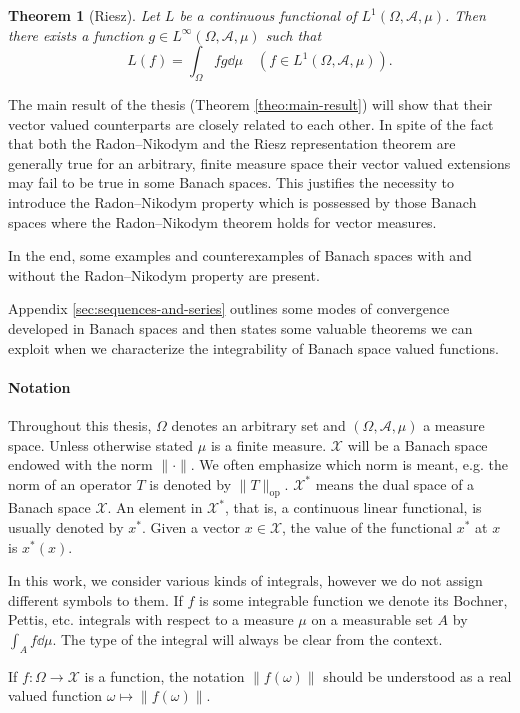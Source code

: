 \documentclass[a4paper, 12pt]{article}
\newtheorem{theo}[lem]{Theorem}
\begin{document}
\begin{theo}[Riesz] Let $L$ be a continuous functional of $L^1(\Omega, \mathcal{A}, \mu)$. Then there exists a function $g \in L^\infty(\Omega, \mathcal{A}, \mu)$ such that
$$
L(f) = \int_{\Omega} f g \dd{\mu} \quad (f \in L^1(\Omega, \mathcal{A}, \mu)).
$$
\end{theo}
The main result of the thesis (Theorem \ref{theo:main-result}) will show that their vector valued counterparts are closely related to each other. In spite of the fact that both the Radon\---Nikodym and the Riesz representation theorem are generally true for an arbitrary, finite measure space their vector valued extensions may fail to be true in some Banach spaces. This justifies the necessity to introduce the Radon\---Nikodym property which is possessed by those Banach spaces where the Radon\---Nikodym theorem holds for vector measures. 

In the end, some examples and counterexamples of Banach spaces with and without the Radon\---Nikodym property are present. 

Appendix \ref{sec:sequences-and-series} outlines some modes of convergence developed in Banach spaces and then states some valuable theorems we can exploit when we characterize the integrability of Banach space valued functions. 

\paragraph*{Notation}
Throughout this thesis, $\Omega$ denotes an arbitrary set and $(\Omega, \mathcal{A}, \mu)$ a measure space. Unless otherwise stated $\mu$ is a finite measure. $\mathcal{X}$ will be a Banach space endowed with the norm $\| \cdot \|$. We often emphasize which norm is meant, e.g. the norm of an operator $T$ is denoted by $\| T \|_{\mathrm{op}}$. $\mathcal{X}^{*}$ means the dual space of a Banach space $\mathcal{X}$. An element in $\mathcal{X}^*$, that is, a continuous linear functional, is usually denoted by $x^*$. Given a vector $x \in \mathcal{X}$, the value of the functional $x^*$ at $x$ is $x^*(x)$.

In this work, we consider various kinds of integrals, however we do not assign different symbols to them. If $f$ is some integrable function we denote its Bochner, Pettis, etc. integrals with respect to a measure $\mu$ on a measurable set $A$ by $\int_{A} f \dd{\mu}.$ The type of the integral will always be clear from the context.

If $f\colon \Omega \to \mathcal{X}$ is a function, the notation $\| f(\omega) \|$ should be understood as a real valued function $\omega \mapsto \| f(\omega) \|$. 
\end{document}
